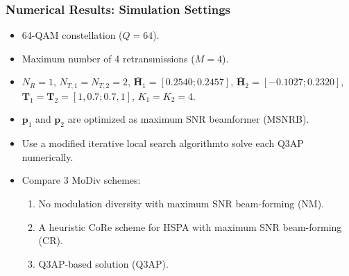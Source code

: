 \documentclass{beamer}
\begin{document}
\begin{frame}
  \frametitle{Numerical Results: Simulation Settings}
  \begin{itemize}[<+->]
    \item 64-QAM constellation ($Q = 64$).
    \item Maximum number of 4 retransmissions ($M = 4$).
    \item $N_R=1$, $N_{T,1}=N_{T,2}=2$, $\bar{\mathbf{H}}_1 = [0.2540;
    0.2457]$, $\bar{\mathbf{H}}_2 = [-0.1027;
    0.2320]$, $\mathbf{T}_1 = \mathbf{T}_2 = [1,0.7;0.7,1]$, $K_1=K_2=4$.
    \item $\mathbf{p}_1$ and $\mathbf{p}_2$ are optimized as maximum SNR
    beamformer (MSNRB).
    \item Use a modified iterative local search algorithm\footnotemark to
    solve each Q3AP numerically.
    \item Compare 3 MoDiv schemes:
      \begin{enumerate}
        \item No modulation diversity with maximum SNR beam-forming (NM).
        \item A heuristic CoRe scheme for HSPA with maximum SNR
        beam-forming (CR).
        \item Q3AP-based solution (Q3AP).
      \end{enumerate}
  \end{itemize}
\end{frame}
\end{document}
